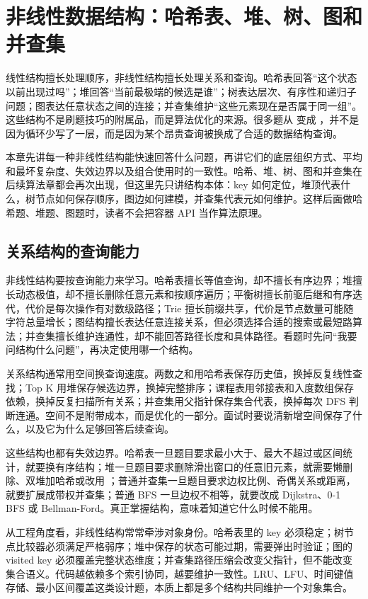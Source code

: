 \chapter{非线性数据结构：哈希表、堆、树、图和并查集}

线性结构擅长处理顺序，非线性结构擅长处理关系和查询。哈希表回答“这个状态以前出现过吗”；堆回答“当前最极端的候选是谁”；树表达层次、有序性和递归子问题；图表达任意状态之间的连接；并查集维护“这些元素现在是否属于同一组”。这些结构不是刷题技巧的附属品，而是算法优化的来源。很多题从  变成 ，并不是因为循环少写了一层，而是因为某个昂贵查询被换成了合适的数据结构查询。

本章先讲每一种非线性结构能快速回答什么问题，再讲它们的底层组织方式、平均和最坏复杂度、失效边界以及组合使用时的一致性。哈希、堆、树、图和并查集在后续算法章都会再次出现，但这里先只讲结构本体：key 如何定位，堆顶代表什么，树节点如何保存顺序，图边如何建模，并查集代表元如何维护。这样后面做哈希题、堆题、图题时，读者不会把容器 API 当作算法原理。

\section{关系结构的查询能力}

非线性结构要按查询能力来学习。哈希表擅长等值查询，却不擅长有序边界；堆擅长动态极值，却不擅长删除任意元素和按顺序遍历；平衡树擅长前驱后继和有序迭代，代价是每次操作有对数级路径；Trie 擅长前缀共享，代价是节点数量可能随字符总量增长；图结构擅长表达任意连接关系，但必须选择合适的搜索或最短路算法；并查集擅长维护连通性，却不能回答路径长度和具体路径。看题时先问“我要问结构什么问题”，再决定使用哪一个结构。

关系结构通常用空间换查询速度。两数之和用哈希表保存历史值，换掉反复线性查找；Top K 用堆保存候选边界，换掉完整排序；课程表用邻接表和入度数组保存依赖，换掉反复扫描所有关系；并查集用父指针保存集合代表，换掉每次 DFS 判断连通。空间不是附带成本，而是优化的一部分。面试时要说清新增空间保存了什么，以及它为什么足够回答后续查询。

这些结构也都有失效边界。哈希表一旦题目要求最小大于、最大不超过或区间统计，就要换有序结构；堆一旦题目要求删除滑出窗口的任意旧元素，就需要懒删除、双堆加哈希或改用 ；普通并查集一旦题目要求边权比例、奇偶关系或距离，就要扩展成带权并查集；普通 BFS 一旦边权不相等，就要改成 Dijkstra、0-1 BFS 或 Bellman-Ford。真正掌握结构，意味着知道它什么时候不能用。

从工程角度看，非线性结构常常牵涉对象身份。哈希表里的 key 必须稳定；树节点比较器必须满足严格弱序；堆中保存的状态可能过期，需要弹出时验证；图的 visited key 必须覆盖完整状态维度；并查集路径压缩会改变父指针，但不能改变集合语义。代码越依赖多个索引协同，越要维护一致性。LRU、LFU、时间键值存储、最小区间覆盖这类设计题，本质上都是多个结构共同维护一个对象集合。

